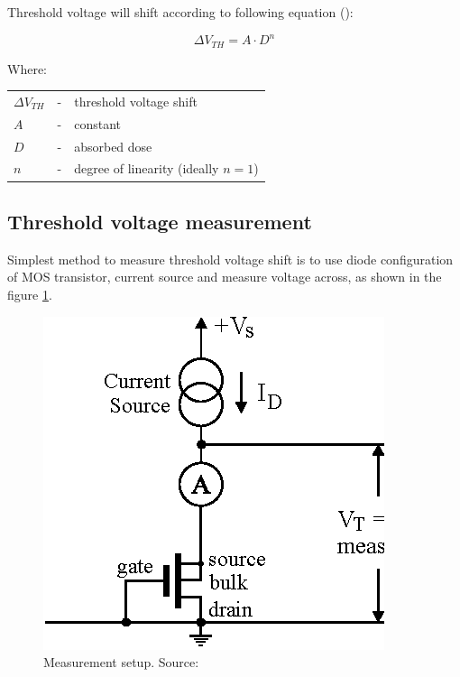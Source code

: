         Threshold voltage will shift according to following equation (\cite{pMOS_dosimeters_radfets}):

        $$\Delta V_{TH} = A \cdot D^n$$

        Where:

        \begin{tabular}{lcl}
            $\Delta V_{TH}$ & - & threshold voltage shift \\
            $A$ & - & constant \\
            $D$ & - & absorbed dose \\
            $n$ & - & degree of linearity (ideally $n = 1$) \\
        \end{tabular}
        \bigskip



    \subsection{Threshold voltage measurement}
        Simplest method to measure threshold voltage shift is to use diode configuration of MOS transistor, current source and measure voltage across, as shown in the figure \ref{MOS_measurement_setup}.

        \begin{figure}[H]
            \centering
            \includegraphics[width=0.3\paperwidth]{img/03/Vth-measurement-setup.eps}
            \caption{Measurement setup. Source: \cite{pMOS_dosimeters_radfets}}
            \label{MOS_measurement_setup}
        \end{figure}

